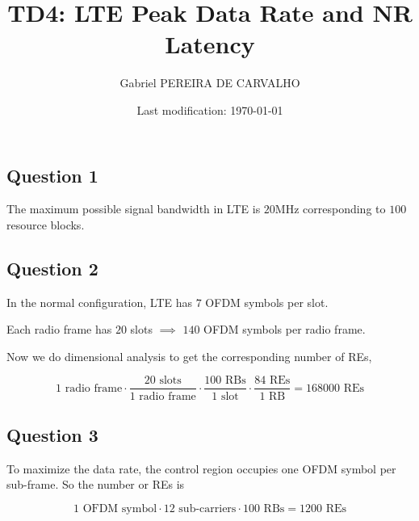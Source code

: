 \documentclass[]{article}
\title{TD4: LTE Peak Data Rate and NR Latency}
\author{Gabriel PEREIRA DE CARVALHO}
\date{Last modification: \today}
\begin{document}
	
	\maketitle
	
	\subsection*{Question 1}
	
	The maximum possible signal bandwidth in LTE is $20$MHz corresponding to $100$ resource blocks.
	
	\subsection*{Question 2}
	
	In the normal configuration, LTE has $7$ OFDM symbols per slot.
	
	Each radio frame has $20$ slots $\implies$ $140$ OFDM symbols per radio frame.
	
	Now we do dimensional analysis to get the corresponding number of REs,
	
	\begin{equation}
		1 \text{ radio frame} \cdot \frac{20 \text{ slots}}{1 \text{ radio frame}} \cdot \frac{100 \text{ RBs}}{1 \text{ slot}} \cdot \frac{84 \text{ REs}}{1 \text{ RB}} = 168000 \text{ REs}
	\end{equation}
	
	\subsection*{Question 3}
	
	To maximize the data rate, the control region occupies one OFDM symbol per sub-frame. So the number or REs is
	
	\begin{equation}
		1 \text{ OFDM symbol} \cdot 12 \text{ sub-carriers} \cdot 100 \text{ RBs} = 1200 \text{ REs}
	\end{equation}
	
	
\end{document}
